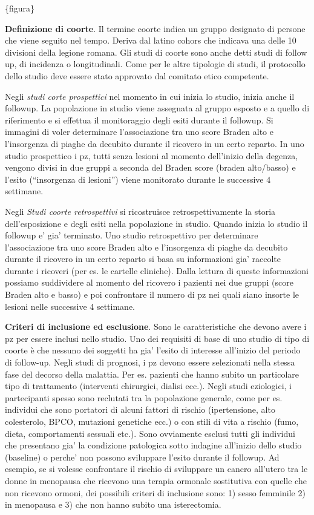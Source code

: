 \documentclass[]{book}
\begin{document}
\{figura\}

\textbf{Definizione di coorte}. Il termine coorte indica un gruppo designato di persone che viene seguito nel tempo.
Deriva dal latino cohors che indicava una delle 10 divisioni della legione romana. Gli studi di coorte sono anche detti studi di follow up, di incidenza o longitudinali. Come per le altre tipologie di studi, il protocollo dello studio deve essere stato approvato dal comitato etico competente.

Negli \emph{studi corte prospettici} nel momento in cui inizia lo studio, inizia anche il followup. La popolazione in studio viene assegnata al gruppo esposto e a quello di riferimento e si effettua il monitoraggio degli esiti durante il followup. Si immagini di voler determinare l'associazione tra uno score Braden alto e l'insorgenza di piaghe da decubito durante il ricovero in un certo reparto. In uno studio prospettico i pz, tutti senza lesioni al momento dell'inizio della degenza, vengono divisi in due gruppi a seconda del Braden score (braden alto/basso) e l'esito (``insorgenza di lesioni'') viene monitorato durante le successive 4 settimane.

Negli \emph{Studi coorte retrospettivi} si ricostruisce retrospettivamente la storia dell'esposizione e degli esiti nella popolazione in studio. Quando inizia lo studio il followup e' gia' terminato. Uno studio retrospettivo per determinare l'associazione tra uno score Braden alto e l'insorgenza di piaghe da decubito durante il ricovero in un certo reparto si basa su informazioni gia' raccolte durante i ricoveri (per es. le cartelle cliniche). Dalla lettura di queste informazioni possiamo suddividere al momento del ricovero i pazienti nei due gruppi (score Braden alto e basso) e poi confrontare il numero di pz nei quali siano insorte le lesioni nelle successive 4 settimane.

\textbf{Criteri di inclusione ed esclusione}. Sono le caratteristiche che devono avere i pz per essere inclusi nello studio. Uno dei requisiti di base di uno studio di tipo di coorte è che nessuno dei soggetti ha gia' l'esito di interesse all'inizio del periodo di follow-up.
Negli studi di prognosi, i pz devono essere selezionati nella stessa fase del decorso della malattia. Per es. pazienti che hanno subito un particolare tipo di trattamento (interventi chirurgici, dialisi ecc.).
Negli studi eziologici, i partecipanti spesso sono reclutati tra la popolazione generale, come per es. individui che sono portatori di alcuni fattori di rischio (ipertensione, alto colesterolo, BPCO, mutazioni genetiche ecc.) o con stili di vita a rischio (fumo, dieta, comportamenti sessuali etc.).
Sono ovviamente esclusi tutti gli individui che presentano gia' la condizione patologica sotto indagine all'inizio dello studio (baseline) o perche' non possono sviluppare l'esito durante il followup. Ad esempio, se si volesse confrontare il rischio di sviluppare un cancro all'utero tra le donne in menopausa che ricevono una terapia ormonale sostitutiva con quelle che non ricevono ormoni, dei possibili criteri di inclusione sono: 1) sesso femminile 2) in menopausa e 3) che non hanno subito una isterectomia.
\end{document}
